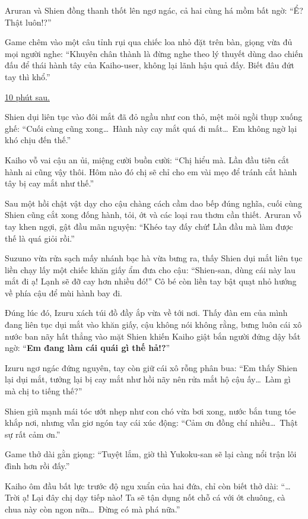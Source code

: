 \documentclass[../main.tex]{subfiles}
\begin{document}
Aruran và Shien đồng thanh thốt lên ngơ ngác, cả hai cùng há mồm bất ngờ: ``Ể? Thật luôn!?''

Game chêm vào một câu tỉnh rụi qua chiếc loa nhỏ đặt trên bàn, giọng vừa đủ mọi người nghe: ``Khuyên chân thành là đừng nghe theo lý thuyết dùng dao chiến đấu để thái hành tây của Kaiho-user, không lại lãnh hậu quả đấy. Biết đâu đứt tay thì khổ.''

\begin{center}
  \uline{10 phút sau.}
\end{center}

Shien dụi liên tục vào đôi mắt đã đỏ ngầu như con thỏ, mệt mỏi ngồi thụp xuống ghế: ``Cuối cùng cũng xong\dots\ Hành này cay mắt quá đi mất\dots\ Em không ngờ lại khó chịu đến thế.''

Kaiho vỗ vai cậu an ủi, miệng cười buồn cười: ``Chị hiểu mà. Lần đầu tiên cắt hành ai cũng vậy thôi. Hôm nào đó chị sẽ chỉ cho em vài mẹo để tránh cắt hành tây bị cay mắt như thế.''

Sau một hồi chật vật dạy cho cậu chàng cách cầm dao bếp đúng nghĩa, cuối cùng Shien cũng cắt xong đống hành, tỏi, ớt và các loại rau thơm cần thiết. Aruran vỗ tay khen ngợi, gật đầu mãn nguyện: ``Khéo tay đấy chứ! Lần đầu mà làm được thế là quá giỏi rồi.''

Suzuno vừa rửa sạch mấy nhánh bạc hà vừa bưng ra, thấy Shien dụi mắt liên tục liền chạy lấy một chiếc khăn giấy ẩm đưa cho cậu: ``Shien-san, dùng cái này lau mắt đi ạ! Lạnh sẽ đỡ cay hơn nhiều đó!'' Cô bé còn liền tay bật quạt nhỏ hướng về phía cậu để mùi hành bay đi.

Đúng lúc đó, Izuru xách túi đồ đầy ắp vừa về tới nơi. Thấy đàn em của mình đang liên tục dụi mắt vào khăn giấy, cậu không nói không rằng, bưng luôn cái xô nước ban nãy hất thẳng vào mặt Shien khiến Kaiho giật bắn người đứng dậy bất ngờ: ``\textbf{Em đang làm cái quái gì thế hả!?}''

Izuru ngơ ngác đứng nguyên, tay còn giữ cái xô rỗng phân bua: ``Em thấy Shien lại dụi mắt, tưởng lại bị cay mắt như hồi nãy nên rửa mắt hộ cậu ấy\dots\ Làm gì mà chị to tiếng thế?''

Shien giũ mạnh mái tóc ướt nhẹp như con chó vừa bơi xong, nước bắn tung tóe khắp nơi, nhưng vẫn giơ ngón tay cái xúc động: ``Cảm ơn đồng chí nhiều\dots\ Thật sự rất cảm ơn.''

Game thở dài gằn giọng: ``Tuyệt lắm, giờ thì Yukoku-san sẽ lại càng nổi trận lôi đình hơn rồi đấy.''

Kaiho ôm đầu bất lực trước độ ngu xuẩn của hai đứa, chỉ còn biết thở dài: ``\dots Trời ạ! Lại đây chị dạy tiếp nào! Ta sẽ tận dụng nốt chỗ cá với ớt chuông, cà chua này còn ngon nữa\dots\ Đừng có mà phá nữa.''
\end{document}

